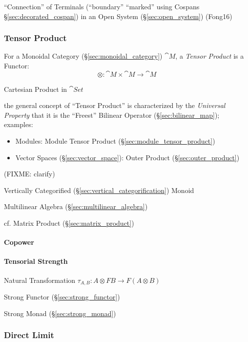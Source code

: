 \fist ``Connection'' of Terminals (``boundary'' ``marked'' using
Cospans \S\ref{sec:decorated_cospan}) in an Open System
(\S\ref{sec:open_system}) (Fong16)



\subsubsection{Tensor Product}\label{sec:tensor_product}

For a Monoidal Category (\S\ref{sec:monoidal_category}) $\cat{M}$,
a \emph{Tensor Product} is a Functor:
\[
  \otimes : \cat{M} \times \cat{M} \rightarrow \cat{M}
\]

Cartesian Product in $\cat{Set}$

the general concept of ``Tensor Product'' is characterized by the
\emph{Universal Property} that it is the ``Freest'' Bilinear Operator
(\S\ref{sec:bilinear_map}); examples:
\begin{itemize}
\item Modules: Module Tensor Product (\S\ref{sec:module_tensor_product})
\item Vector Spaces (\S\ref{sec:vector_space}): Outer Product
  (\S\ref{sec:outer_product})
\end{itemize}
(FIXME: clarify)

Vertically Categorified (\S\ref{sec:vertical_categorification}) Monoid

Multilinear Algebra (\S\ref{sec:multilinear_algebra})

cf. Matrix Product (\S\ref{sec:matrix_product})



\paragraph{Copower}\label{sec:copower}\hfill

\paragraph{Tensorial Strength}\label{sec:tensorial_strength}\hfill

Natural Transformation $\tau_{A,B} : A \otimes F B \rightarrow F (A
\otimes B)$

Strong Functor (\S\ref{sec:strong_functor})

Strong Monad (\S\ref{sec:strong_monad})



\subsubsection{Direct Limit}\label{sec:direct_limit}

